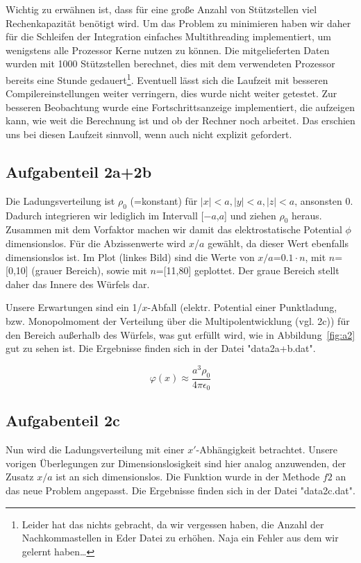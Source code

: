 Wichtig zu erwähnen ist, dass für eine große Anzahl von Stützstellen viel Rechenkapazität benötigt
wird. Um das Problem zu minimieren haben wir daher für die Schleifen der Integration einfaches
Multithreading implementiert, um wenigstens alle Prozessor Kerne nutzen zu können. Die mitgelieferten
Daten wurden mit 1000 Stützstellen berechnet, dies mit dem verwendeten Prozessor bereits eine Stunde
gedauert\footnote{Leider hat das nichts gebracht, da wir vergessen haben, die Anzahl der Nachkommastellen in
Eder Datei zu erhöhen. Naja ein Fehler aus dem wir gelernt haben\ldots}. 
Eventuell lässt sich die Laufzeit mit besseren Compilereinstellungen weiter verringern,
dies wurde nicht weiter getestet. Zur besseren Beobachtung wurde eine Fortschrittsanzeige implementiert, die
aufzeigen kann, wie weit die Berechnung ist und ob der Rechner noch arbeitet. Das erschien uns
bei diesen Laufzeit sinnvoll, wenn auch nicht explizit gefordert.

\subsection*{Aufgabenteil 2a+2b} Die Ladungsverteilung ist $\rho_0$ (=konstant) für $\left|x\right|<
a,\left|y\right| < a,\left|z\right| < a$, ansonsten 0. Dadurch integrieren wir lediglich im
Intervall [$-a$,$a$] und ziehen $\rho_0$ heraus. Zusammen mit dem Vorfaktor machen wir damit das
elektrostatische Potential $\phi$ dimensionslos. Für die Abzissenwerte wird $x$/$a$ gewählt, da
dieser Wert ebenfalls dimensionslos ist. Im Plot (linkes Bild) sind die Werte von $x/a$=$0.1\cdot
n$, mit $n$=[0,10] (grauer Bereich), sowie mit $n$=[11,80] geplottet. Der graue Bereich stellt daher
das Innere des Würfels dar.

Unsere Erwartungen sind ein 1/$x$-Abfall (elektr. Potential einer Punktladung, bzw. Monopolmoment
der Verteilung über die Multipolentwicklung (vgl. 2c)) für den Bereich außerhalb des Würfels, was gut erfüllt wird, wie in
Abbildung~\ref{fig:a2} gut zu sehen ist. 
Die Ergebnisse finden sich in der Datei "data2a+b.dat".

\begin{equation*}
\varphi (x) \approx \frac{a^3 \rho_0}{4\pi \epsilon_0}
\end{equation*}

\subsection*{Aufgabenteil 2c} Nun wird die Ladungsverteilung mit einer $x'$-Abhängigkeit betrachtet.
Unsere vorigen Überlegungen zur Dimensionslosigkeit sind hier analog anzuwenden, der Zusatz $x/a$
ist an sich dimensionslos. Die Funktion wurde in der Methode $f2$ an das neue Problem angepasst.
Die Ergebnisse finden sich in der Datei "data2c.dat".

